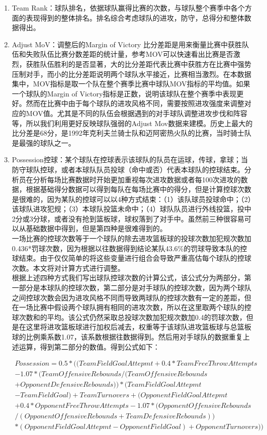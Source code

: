 \begin{enumerate}
\begin{enumerate}
		\item Team Rank：球队排名，依据球队赢得比赛的次数，与球队整个赛季中各个方面的表现得到的整体排名。排名综合考虑球队的进攻，防守，总得分和整体数据得出。
		\item Adjust MoV：调整后的Margin of Victory 比分差距是用来衡量比赛中获胜队伍和失败队伍比赛分数差距的统计量，参考MOV可以快速看出比赛是否激烈，获胜队伍胜利的是否显著，大的比分差距代表比赛中获胜方在比赛中强势压制对手，而小的比分差距说明两个球队水平接近，比赛相当激烈。在本数据集中，MOV指标是取一个队在整个赛季比赛中球队MOV指标的平均值。如果一个球队的Margin of Victory指标是正数，说明该球队在整个赛季中表现更好。然而在比赛中由于每个球队的进攻风格不同，需要按照进攻强度来调整对应的MOV值。尤其是不同的队伍会根据遇到的对手球队调整进攻步伐和阵容等，所以我们利用更好反映球队强弱的Adjust Mov数据来建模。历史上最大的比分差是68分，是1992年克利夫兰骑士队和迈阿密热火队的比赛，当时骑士队是最强的球队之一。
			\item
		Possession控球\cite{kubatko2007starting}：某个球队在控球表示该球队的队员在运球，传球，拿球；当防守球队控球，或者本球队队员投球（命中或否）代表本球队的控球结束。分析员在分析每场比赛数据时开始更加重视每次进攻数据或者每100次进攻的数据，根据基础得分数据可以得到每队在每场比赛中的得分，但是计算控球次数是很难的，因为某队的控球可以以4种方式结束：（1）该队球员投球命中；（2）该球队进攻犯规；（3）本球队投篮未命中；（4）球队队员进行外线投篮，投中2分或3分球，或者没有抢到篮板球，球权落到了对手中。虽然前三种很容易可以从基础数据中得到，但是第四种是很难得到的。\\
		一场比赛的控球次数等于一个球队的除去进攻篮板球的投球次数加犯规次数加0.436*罚球次数，因为根据以往数据得到结论某队43.6\%的罚球导致本队的控球结束。由于仅仅简单的将这些变量进行组合会导致严重高估每个球队的控球次数。本文将对计算方式进行调整。\\
		根据上述四种方式我们写出球队控球次数的计算公式，该公式分为两部分，第一部分是本球队的控球次数，第二部分是对手球队的控球次数，因为两个球队之间控球次数会因为进攻风格不同而导致两球队的控球次数有一定的差距，但在一场比赛中假设两个球队拥有相同的进攻次数，所以在这里取两个球队的控球次数和的平均。该公式仍然采取总投球次数加犯规次数加0.4的罚球次数，但是在这里将进攻篮板球进行加权后减去，权重等于该球队进攻篮板球与总篮板球的比例乘系数1.07，该系数根据往数据得到。然后用对手球队的数据重复上述运算，得到第二部分的数值。得到公式如下：
		
		\begin{multline}
		Possession = 0.5 * ((Team Field Goal Attepmt + 0.4 * Team Free Throw Attempts \\- 1.07 * (Team Offensive Rebounds / (Team Offensive Rebounds \\+ Opponent Defensive Rebounds)) * (Team Field Goal Attepmt \\- Team Field Goal) + Team Turnovers +(Opponent Field Goal Attepmt \\+ 0.4 * Opponent Free Throw Attempts- 1.07 * (Opponent Offensive Rebounds \\/ (Opponent Offensive Rebounds + Team Defensive Rebounds)) \\* (Opponent Field Goal Attepmt - Opponent Field Goal) + Opponent Turnovers))
		\end{multline}
		

\end{enumerate}
\end{enumerate}
